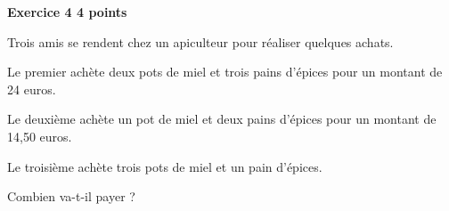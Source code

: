 \textbf{Exercice 4 \hfill 4 points}

\medskip

Trois amis se rendent chez un apiculteur pour réaliser quelques achats. 
\medskip

Le premier achète deux pots de miel et trois pains d'épices pour un montant de 24 euros.

Le deuxième achète un pot de miel et deux pains d'épices pour un montant de 14,50 euros. 

Le troisième achète trois pots de miel et un pain d'épices. 

Combien va-t-il payer ? 

\vspace{0.5cm}

